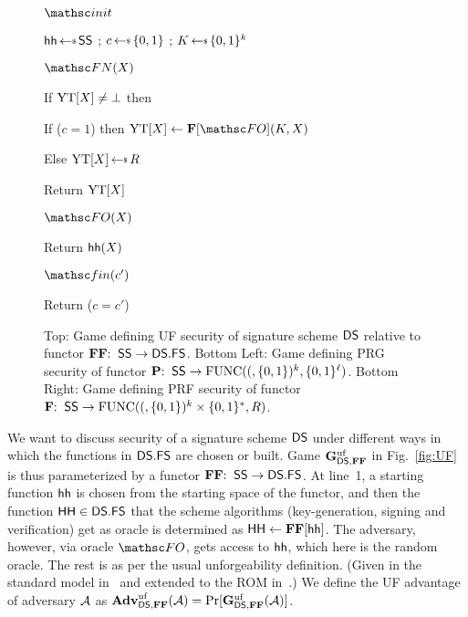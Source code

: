 \begin{figure}[t]
{		\begin{oracle}{$\Initialize$}
			\item
			$\hh \getsr \startSpace$  
			; $c \getsr \bits$ 
		; $K\getsr\bits^k$  
		\end{oracle}
		\ExptSepSpace

		\begin{oracle}{$\FUNCO(X)$}
			\item If $\mathrm{YT}[X]\neq\bot$ then
			\item \hindent If ($c=1$) then $\YTable[X]\gets \construct{F}[\HASH](K,X)$ 
			\item \hindent Else $\YTable[X] \getsr R$
			\item Return  $\mathrm{YT}[X]$
		\end{oracle}
		\ExptSepSpace
		
		\begin{oracle}{$\HASH(X)$}
			\item Return $\mathsf{hh}(X)$
		\end{oracle}
		\ExptSepSpace


		\begin{oracle}{$\Finalize(c')$}
			\item Return ($c=c'$) \vspace{2pt}
		\end{oracle}
}	

		\vspace{-5pt}
	\caption{Top: Game defining UF security of signature scheme $\mathsf{DS}$ relative to functor $\mathbf{FF}{:\;\;}\mathsf{SS}\to\mathsf{DS}.\mathsf{FS}$. Bottom Left: Game defining PRG security of functor $\mathbf{P}{:\;\;}\mathsf{SS}\to\mathrm{FUNC}((,\{0,1\})^k,\{0,1\}^{\ell})$. Bottom Right: Game defining PRF security of functor $\mathbf{F}{:\;\;}\mathsf{SS}\to\mathrm{FUNC}((,\{0,1\})^k\times\{0,1\}^*,R)$.}
	\label{fig:UF}\label{fig:fUF}\label{fig-prf}\label{fig-prg}
	\hrulefill
	\vspace{-10pt}
\end{figure}

 We want to discuss security of a signature scheme $\mathsf{DS}$ under different ways in which the functions in $\mathsf{DS}.\mathsf{FS}$ are chosen or built. Game $\mathbf{G}^{\mathrm{uf}}_{\mathsf{DS},\mathbf{FF}}$ in Fig.~\ref{fig:UF} is thus parameterized by a functor $\mathbf{FF}{:\;\;}\mathsf{SS}\to\mathsf{DS}.\mathsf{FS}$. At line~1, a starting function $\mathsf{hh}$ is chosen from the starting space of the functor, and then the function $\mathsf{HH} \in \mathsf{DS}.\mathsf{FS}$ that the scheme algorithms (key-generation, signing and verification) get as oracle is determined as $\mathsf{HH} \gets \mathbf{FF}[\mathsf{hh}]$. The adversary, however, via oracle $\HASH$, gets access to $\mathsf{hh}$, which here is the random oracle. The rest is as per the usual unforgeability definition. (Given in the standard model in~\cite{GolMicRiv88} and extended to the ROM in~\cite{CCS:BelRog93}.) We define the UF advantage of adversary $\mathcal{A}$ as $\mathbf{Adv}^{\mathrm{uf}}_{\mathsf{DS},\mathbf{FF}}(\mathcal{A}) = \Pr[\mathbf{G}^{\mathrm{uf}}_{\mathsf{DS},\mathbf{FF}}(\mathcal{A})]$.


